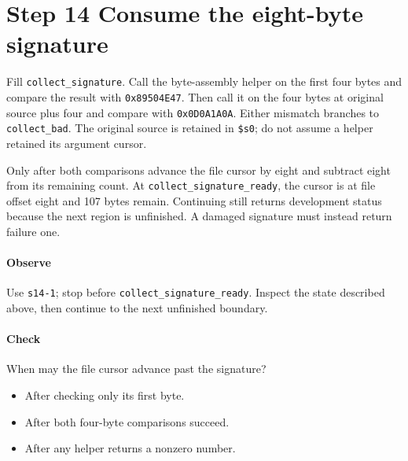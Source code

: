\section{Step 14 Consume the eight-byte signature}\label{png-collect-s14}
Fill \texttt{collect\_signature}. Call the byte-assembly helper on the first four bytes and compare the result with \texttt{0x89504E47}. Then call it on the four bytes at original source plus four and compare with \texttt{0x0D0A1A0A}. Either mismatch branches to \texttt{collect\_bad}. The original source is retained in \texttt{\$s0}; do not assume a helper retained its argument cursor.

Only after both comparisons advance the file cursor by eight and subtract eight from its remaining count. At \texttt{collect\_signature\_ready}, the cursor is at file offset eight and 107 bytes remain. Continuing still returns development status because the next region is unfinished. A damaged signature must instead return failure one.

\paragraph{Observe} Use \texttt{s14-1}; stop before \texttt{collect\_signature\_ready}. Inspect the state described above, then continue to the next unfinished boundary.

\paragraph{Check} When may the file cursor advance past the signature?
\begin{itemize}
  \item[A.] After checking only its first byte.
  \item[B.] After both four-byte comparisons succeed.
  \item[C.] After any helper returns a nonzero number.
\end{itemize}
